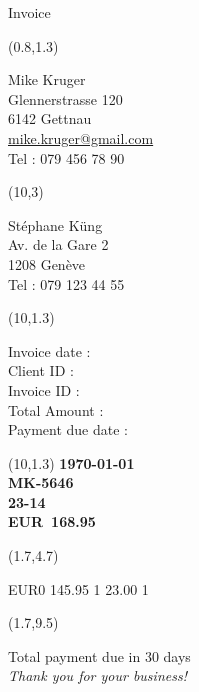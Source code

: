 \documentclass[a4paper,12pt]{letter}
\makeatletter
\newenvironment{calibri}{\mymainfont}{}
\newcommand{\thedate}{\today}
\newcommand{\thefinaldate}{\DayAfter[30]}
\newcommand\francs{168}
\newcommand\cents{95}
\newcommand\clientid{MK-5646}
\newcommand\invoiceid{23-14}
\newcommand\currencycode{EUR}
\newcommand\mycompanyname{Mike Kruger\\Glennerstrasse 120\\6142 Gettnau\\\href{mailto:mike.kruger@gmail.com}{mike.kruger@gmail.com}\\Tel : 079 456 78 90}
\newcommand\clientname{Stéphane Küng\\Av. de la Gare 2\\1208 Genève\\Tel : 079 123 44 55\\}
\makeatother
\begin{document}
\begin{calibri}
{\huge Invoice}

\begin{textblock}{12.6}(0.8,1.3)
\raggedright
{\small \mycompanyname}
\end{textblock}

\begin{textblock}{12.6}(10,3)
\raggedright
{\large \clientname}
\end{textblock}

\begin{textblock}{4}(10,1.3)
\raggedright
{\small 
Invoice date :  \\
Client ID : \\
Invoice ID : \\
Total Amount : \\
Payment due date :
}
\end{textblock}

\begin{textblock}{4}(10,1.3)
\raggedleft
{\small 
\textbf{\thedate}\\
\textbf{\clientid}\\
\textbf{\invoiceid}\\
\textbf{\currencycode\ \francs.\cents}\\
\textbf{\thefinaldate}}
\end{textblock}

\begin{textblock}{12.6}(1.7,4.7)
 \begin{invoice}{\currencycode}{0}
       {145.95} {1}
       {23.00} {1}
    \end{invoice}
\end{textblock}

\begin{textblock}{12.6}(1.7,9.5)
\raggedright
Total payment due in 30 days\\
\textit{Thank you for your business!}
\end{textblock}

\end{calibri}   
\end{document}
